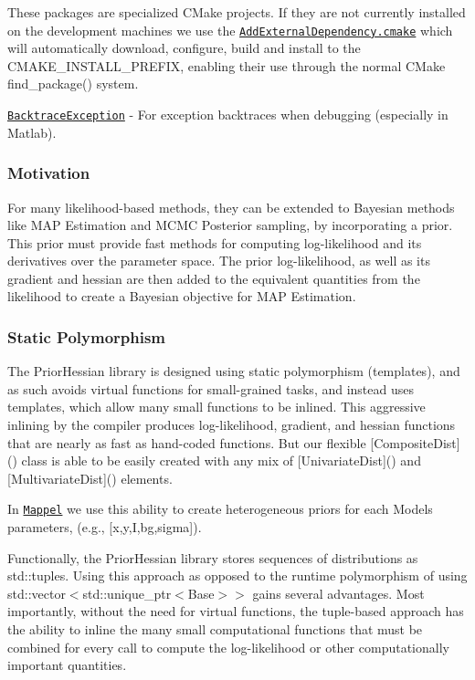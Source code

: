 These packages are specialized C\+Make projects. If they are not currently installed on the development machines we use the \href{https://github.com/markjolah/UncommonCMakeModules/blob/master/AddExternalDependency.cmake}{\tt Add\+External\+Dependency.\+cmake} which will automatically download, configure, build and install to the {\ttfamily C\+M\+A\+K\+E\+\_\+\+I\+N\+S\+T\+A\+L\+L\+\_\+\+P\+R\+E\+F\+IX}, enabling their use through the normal C\+Make {\ttfamily find\+\_\+package()} system.


\begin{DoxyItemize}
\item \href{https://github.com/markjolah/BacktraceException}{\tt Backtrace\+Exception} -\/ For exception backtraces when debugging (especially in Matlab).
\end{DoxyItemize}

\subsubsection*{Motivation}

For many likelihood-\/based methods, they can be extended to Bayesian methods like M\+AP Estimation and M\+C\+MC Posterior sampling, by incorporating a prior. This prior must provide fast methods for computing log-\/likelihood and it\textquotesingle{}s derivatives over the parameter space. The prior log-\/likelihood, as well as it\textquotesingle{}s gradient and hessian are then added to the equivalent quantities from the likelihood to create a Bayesian objective for M\+AP Estimation.

\subsubsection*{Static Polymorphism}

The Prior\+Hessian library is designed using static polymorphism (templates), and as such avoids virtual functions for small-\/grained tasks, and instead uses templates, which allow many small functions to be inlined. This aggressive inlining by the compiler produces log-\/likelihood, gradient, and hessian functions that are nearly as fast as hand-\/coded functions. But our flexible \mbox{[}{\ttfamily Composite\+Dist}\mbox{]}() class is able to be easily created with any mix of \mbox{[}{\ttfamily Univariate\+Dist}\mbox{]}() and \mbox{[}{\ttfamily Multivariate\+Dist}\mbox{]}() elements.

In \href{https://github.com/markjolah/Mappel}{\tt Mappel} we use this ability to create heterogeneous priors for each Model\textquotesingle{}s parameters, (e.\+g., \mbox{[}x,y,I,bg,sigma\mbox{]}).

Functionally, the Prior\+Hessian library stores sequences of distributions as {\ttfamily std\+::tuples}. Using this approach as opposed to the runtime polymorphism of using {\ttfamily std\+::vector$<$std\+::unique\+\_\+ptr$<$Base$>$$>$} gains several advantages. Most importantly, without the need for virtual functions, the tuple-\/based approach has the ability to inline the many small computational functions that must be combined for every call to compute the log-\/likelihood or other computationally important quantities. 